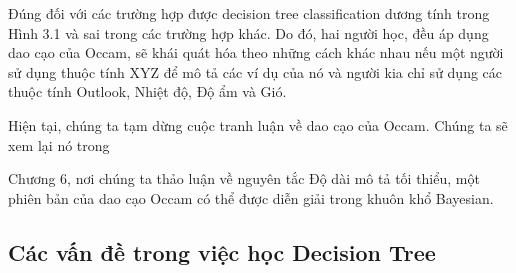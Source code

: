 Đúng đối với các trường hợp được decision tree classification dương tính trong Hình 3.1 và sai trong các trường hợp khác. Do đó, hai người học, đều áp dụng dao cạo của Occam, sẽ khái quát hóa theo những cách khác nhau nếu một người sử dụng thuộc tính XYZ để mô tả các ví dụ của nó và người kia chỉ sử dụng các thuộc tính Outlook, Nhiệt độ, Độ ẩm và Gió.

Hiện tại, chúng ta tạm dừng cuộc tranh luận về dao cạo của Occam. Chúng ta sẽ xem lại nó trong

Chương 6, nơi chúng ta thảo luận về nguyên tắc Độ dài mô tả tối thiểu, một phiên bản của dao cạo Occam có thể được diễn giải trong khuôn khổ Bayesian.

\subsection{Các vấn đề trong việc học Decision Tree}

